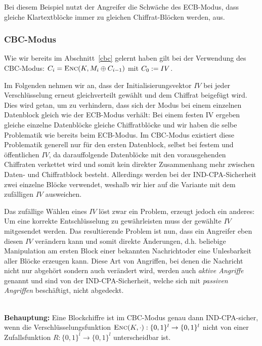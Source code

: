 Bei diesem Beispiel nutzt der Angreifer die Schwäche des ECB-Modus, dass gleiche Klartextblöcke immer zu gleichen Chiffrat-Blöcken werden, aus.

\subsubsection{CBC-Modus}

Wie wir bereits im Abschnitt~\ref{cbc} gelernt haben gilt bei der Verwendung des CBC-Modus: $C_i = \textsc{Enc}(K, M_i \oplus C_{i-1})$ mit
$C_0 := IV$.

Im Folgenden nehmen wir an, dass der Initialisierungsvektor $IV$ bei jeder Verschlüsselung erneut gleichverteilt gewählt und dem Chiffrat beigefügt wird. Dies
wird getan, um zu verhindern, dass sich der Modus bei einem einzelnen Datenblock gleich wie der ECB-Modus verhält: Bei einem festen IV ergeben gleiche einzelne
Datenblöcke gleiche Chiffratblöcke und wir haben die selbe Problematik wie bereits beim ECB-Modus. Im CBC-Modus existiert diese Problematik generell nur für
den ersten Datenblock, selbst bei festem und öffentlichen $IV$, da darauffolgende Datenblöcke mit den vorausgehenden Chiffraten verkettet wird und somit kein
direkter Zusammenhang mehr zwischen Daten- und Chiffratblock besteht. Allerdings werden bei der IND-CPA-Sicherheit zwei einzelne Blöcke verwendet, weshalb wir
hier auf die Variante mit dem zufälligen $IV$ ausweichen.

Das zufällige Wählen eines $IV$ löst zwar ein Problem, erzeugt jedoch ein anderes: Um eine korrekte Entschlüsselung zu gewährleisten muss der gewählte $IV$
mitgesendet werden. Das resultierende Problem ist nun, dass ein Angreifer eben diesen $IV$ verändern kann und somit \glqq direkte Änderungen\grqq, d.h.
beliebige Manipulation am ersten Block einer bekannten Nachrichtoder eine Unlesbarkeit aller Blöcke erzeugen kann. Diese Art von Angriffen, bei denen die
Nachricht nicht nur abgehört sondern auch verändert wird, werden auch \emph{aktive Angriffe} 
genannt und sind von der IND-CPA-Sicherheit, welche sich mit \emph{passiven Angriffen} beschäftigt, nicht abgedeckt.

~\\
\textbf{Behauptung:} Eine Blockchiffre ist im CBC-Modus genau dann IND-CPA-sicher, wenn die Verschlüsselungsfunktion $\textsc{Enc}(K,\cdot) : \{0,1\}^l \rightarrow
\{0,1\}^l$ nicht von einer Zufallsfunktion $R: \{0,1\}^l \rightarrow \{0,1\}^l$ unterscheidbar ist.
\newpage


